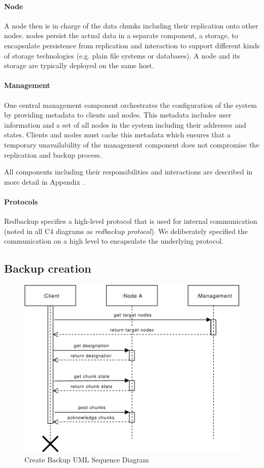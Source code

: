 \paragraph{Node}
A \gls{node} then is in charge of the data \glspl{chunk} including their replication onto other \glspl{node}. \Glspl{node} persist the actual data in a separate component, a \gls{storage}, to encapsulate persistence from replication and interaction to support different kinds of storage technologies (e.g. plain file systems or databases). A \gls{node} and its \gls{storage} are typically deployed on the same host.

\paragraph{Management}
One central \gls{management} component orchestrates the configuration of the system by providing metadata to \glspl{client} and \glspl{node}. This metadata includes user information and a set of all \glspl{node} in the system including their addresses and states. \Glspl{Client} and \glspl{node} must cache this metadata which ensures that a temporary unavailability of the \gls{management} component does not compromise the replication and backup process.

All components including their responsibilities and interactions are described in more detail in Appendix .

\paragraph{Protocols} Redbackup specifies a high-level protocol that is used for internal communication (noted in all C4 diagrams as \emph{redbackup protocol}). We deliberately specified the communication on a high level to encapsulate the underlying protocol.

\subsection{Backup creation}
\begin{figure}[h]
    \centering
    \includegraphics[width=\linewidth]{resources/create_backup}
    \caption{Create Backup UML Sequence Diagram}
\end{figure}

